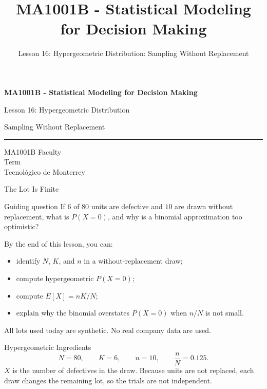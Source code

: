 \documentclass[aspectratio=169,10pt,english]{beamer}
\title{MA1001B - Statistical Modeling for Decision Making}
\subtitle{Lesson 16: Hypergeometric Distribution: Sampling Without Replacement}
\author{}
\institute{Tecnol\'ogico de Monterrey}
\date{}
\begin{document}
\begin{frame}[plain]
  \vspace{1.2cm}
  {\Large\bfseries MA1001B - Statistical Modeling for Decision Making\par}
  \vspace{0.7cm}
  {\large Lesson 16: Hypergeometric Distribution\par}
  \vspace{0.15cm}
  {\large Sampling Without Replacement\par}
  \vspace{0.7cm}
  {\color{TecRojo}\rule{\textwidth}{1.2pt}}
  \vspace{0.8cm}

  MA1001B Faculty\\[0.3cm]
  Term\\[0.3cm]
  Tecnol\'ogico de Monterrey
\end{frame}

\begin{frame}{The Lot Is Finite}
  \begin{alertblock}{Guiding question}
    If $6$ of $80$ units are defective and $10$ are drawn without replacement,
    what is $P(X=0)$, and why is a binomial approximation too optimistic?
  \end{alertblock}

  \vspace{0.6em}
  By the end of this lesson, you can:
  \begin{itemize}
    \item identify $N$, $K$, and $n$ in a without-replacement draw;
    \item compute hypergeometric $P(X=0)$;
    \item compute $E[X]=nK/N$;
    \item explain why the binomial overstates $P(X=0)$ when $n/N$ is not small.
  \end{itemize}

  \vfill
  \scriptsize All lots used today are synthetic. No real company data are used.
\end{frame}

\begin{frame}{Hypergeometric Ingredients}
  \small
  \[
    N=80,\qquad K=6,\qquad n=10,\qquad \frac{n}{N}=0.125.
  \]
  $X$ is the number of defectives in the draw. Because units are not replaced,
  each draw changes the remaining lot, so the trials are not independent.
\end{frame}
\end{document}
